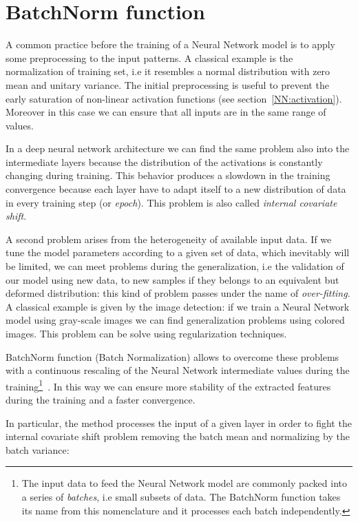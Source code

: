 \documentclass{standalone}
\begin{document}
\section[BatchNorm function]{BatchNorm function}\label{NN:batchnorm}

A common practice before the training of a Neural Network model is to apply some preprocessing to the input patterns.
A classical example is the normalization of training set, i.e it resembles a normal distribution with zero mean and unitary variance.
The initial preprocessing is useful to prevent the early saturation of non-linear activation functions (see section~\ref{NN:activation}).
Moreover in this case we can ensure that all inputs are in the same range of values.

In a deep neural network architecture we can find the same problem also into the intermediate layers because the distribution of the activations is constantly changing during training.
This behavior produces a slowdown in the training convergence because each layer have to adapt itself to a new distribution of data in every training step (or \emph{epoch}).
This problem is also called \emph{internal covariate shift}.

A second problem arises from the heterogeneity of available input data.
If we tune the model parameters according to a given set of data, which inevitably will be limited, we can meet problems during the generalization, i.e the validation of our model using new data, to new samples if they belongs to an equivalent but deformed distribution: this kind of problem passes under the name of \emph{over-fitting}.
A classical example is given by the image detection: if we train a Neural Network model using gray-scale images we can find generalization problems using colored images.
This problem can be solve using regularization techniques.

BatchNorm function (Batch Normalization) allows to overcome these problems with a continuous rescaling of the Neural Network intermediate values during the training\footnote{
  The input data to feed the Neural Network model are commonly packed into a series of \emph{batches}, i.e small subsets of data.
  The BatchNorm function takes its name from this nomenclature and it processes each batch independently.
}~\cite{Sergey2015BatchNorm}.
In this way we can ensure more stability of the extracted features~\cite{Lecun2000EffBackProp} during the training and a faster convergence.

In particular, the method processes the input of a given layer in order to fight the internal covariate shift problem removing the batch mean and normalizing by the batch variance:
\end{document}
